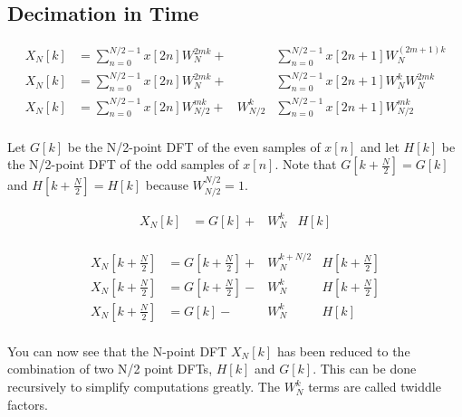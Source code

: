 \documentclass{article}
\begin{document}
\pagebreak

\subsection{Decimation in Time}
\begin{align*}
    X_{N}\left[k\right] &= \sum_{n=0}^{N/2-1}x\left[2n\right] W_{N}^{2mk}   + &             &\sum_{n=0}^{N/2-1}x\left[2n+1\right] W_{N}^{\left(2m+1\right)k} \\
    X_{N}\left[k\right] &= \sum_{n=0}^{N/2-1}x\left[2n\right] W_{N}^{2mk}   + &             &\sum_{n=0}^{N/2-1}x\left[2n+1\right] W_{N}^{k} W_{N}^{2mk} \\
    X_{N}\left[k\right] &= \sum_{n=0}^{N/2-1}x\left[2n\right] W_{N/2}^{mk}  + & W_{N/2}^{k} &\sum_{n=0}^{N/2-1}x\left[2n+1\right] W_{N/2}^{mk} \\
\end{align*}

Let $G\left[k\right]$ be the N/2-point DFT of the even samples of $x\left[n\right]$ and let $H\left[k\right]$ be the N/2-point DFT of the odd samples of $x\left[n\right]$.
    Note that $G\left[k+\frac{N}{2}\right] = G\left[k\right]$ and $H\left[k+\frac{N}{2}\right] = H\left[k\right]$ because $W_{N/2}^{N/2} = 1$.

\begin{minipage}{0.5\textwidth}
  \begin{align*}
    X_{N}\left[k\right]               &= G\left[k\right]                   + & W_{N}^{k}     & H\left[k\right] \\
  \end{align*}
\end{minipage}
\begin{minipage}{0.5\textwidth}
  \begin{align*}
    X_{N}\left[k+\frac{N}{2}\right]   &= G\left[k+\frac{N}{2}\right] + & W_{N}^{k+N/2} & H\left[k+\frac{N}{2}\right] \\
    X_{N}\left[k+\frac{N}{2}\right]   &= G\left[k+\frac{N}{2}\right] - & W_{N}^{k}     & H\left[k+\frac{N}{2}\right] \\
    X_{N}\left[k+\frac{N}{2}\right]   &= G\left[k\right]             - & W_{N}^{k}     & H\left[k\right] \\
  \end{align*}
\end{minipage}

You can now see that the N-point DFT $X_{N}\left[k\right]$ has been reduced to the combination of two N/2 point DFTs, $H\left[k\right]$ and $G\left[k\right]$.
This can be done recursively to simplify computations greatly. The $W_{N}^{k}$ terms are called twiddle factors.
\end{document}
